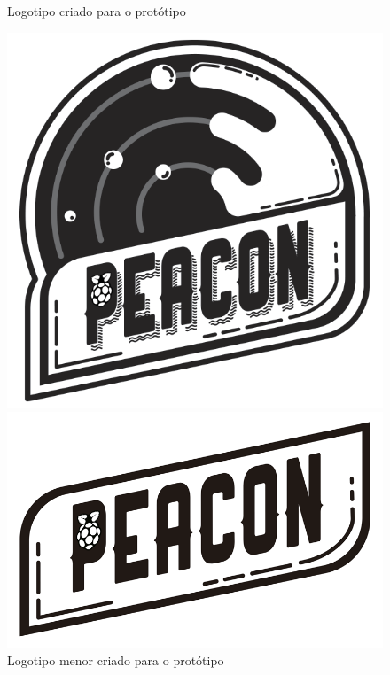 \begin{figure}[htb]
	\centering
 	\begin{minipage}{0.45\textwidth}
		\centering
		\caption{\label{fig:logo-peacon}Logotipo criado para o protótipo}
		\includegraphics[width=1\textwidth]{img/logo-peacon.png}
	\end{minipage}
	\hfill
	\begin{minipage}{0.45\textwidth}
		\centering
		\caption{\label{fig:logo-menor-peacon}Logotipo menor criado para o protótipo}
		\includegraphics[width=1\textwidth]{img/logo-menor-peacon.png}
	\end{minipage}
\end{figure}


